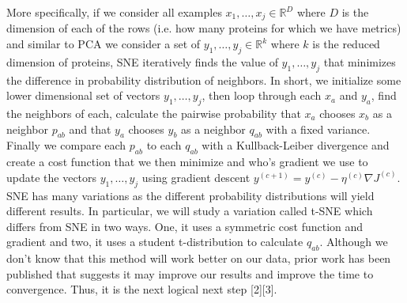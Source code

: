 \documentclass{article} %
\makeatletter
\def\step{%
   \@ifnextchar[ \@step{\@noitemargtrue\@step[\@itemlabel]}}
\def\@step[#1]{\item[#1]\mbox{}\\\hspace*{\dimexpr-\labelwidth-\labelsep}}
\makeatother
\begin{document}
More specifically, if we consider all examples {$ x_1,\ldots,x_j \in \mathbb{R}^D $} where {$ D $} is the dimension of each of the rows (i.e. how many proteins for which we have metrics) and similar to PCA we consider a set of {$ y_1,\ldots, y_j \in \mathbb{R}^k $} where {$ k $} is the reduced dimension of proteins, SNE iteratively finds the value of {$ y_1,\ldots,y_j $} that minimizes the difference in probability distribution of neighbors. In short, we initialize some lower dimensional set of vectors {$ y_1,\ldots,y_j $}, then loop through each {$ x_a $} and {$ y_a $}, find the neighbors of each, calculate the pairwise probability that {$ x_a $} chooses {$ x_b $} as a neighbor {$ p_{ab} $} and that {$y_a$} chooses {$ y_b $} as a neighbor {$ q_{ab} $} with a fixed variance. Finally we compare each {$p_{ab} $} to each {$q_{ab} $} with a Kullback-Leiber divergence and create a cost function that we then minimize and who's gradient we use to update the vectors {$ y_1,\ldots,y_j $} using gradient descent {$ y^{(c+1)} = y^{(c)} - \eta^{(c)}\nabla J^{(c)}  $}. SNE has many variations as the different probability distributions will yield different results. In particular, we will study a variation called t-SNE which differs from SNE in two ways.  One, it uses a symmetric cost function and gradient and two, it uses a student t-distribution to calculate {$ q_{ab} $}. Although we don't know that this method will work better on our data, prior work has been published that suggests it may improve our results and improve the time to convergence. Thus, it is the next logical next step [2][3]. 
%	
\end{document}
